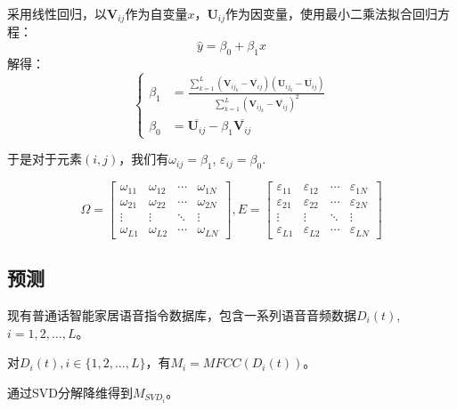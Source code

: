 \documentclass[lang=cn,cite=super]{elegantpaper}
\begin{document}
采用线性回归，以$\mathbf{V}_{ij}$作为自变量$x$，$\mathbf{U}_{ij}$作为因变量，使用最小二乘法拟合回归方程：
\begin{equation}
    \hat{y} = \beta_0 + \beta_1 x
\end{equation}
解得：
\begin{equation}
    \left\{ 
    \begin{aligned}
           \beta_1 &= \frac{\sum_{k=1}^{L} (\mathbf{V}_{{ij}_k}-\overline{\mathbf{V}_{ij}}) (\mathbf{U}_{{ij}_k}-\overline{\mathbf{U}_{ij}})}{\sum_{k=1}^{L} (\mathbf{V}_{{ij}_k}-\overline{\mathbf{V}_{ij}})^2}\\
        \beta_0 &= \overline{\mathbf{U}_{ij}}-\beta_1 \overline{\mathbf{V}_{ij}}
    \end{aligned}
    \right.
\end{equation}

于是对于元素$(i,j)$，我们有$\omega_{ij} = \beta_1$, $\varepsilon_{ij} = \beta_0$.

\begin{equation}
    \Omega = \begin{bmatrix}
        \omega_{11} & \omega_{12} & \cdots & \omega_{1N}\\
        \omega_{21} & \omega_{22} & \cdots & \omega_{2N}\\
        \vdots & \vdots & \ddots & \vdots \\
        \omega_{L1} & \omega_{L2} & \cdots & \omega_{LN}
    \end{bmatrix}, 
    E = \begin{bmatrix}
        \varepsilon_{11} & \varepsilon_{12} & \cdots & \varepsilon_{1N}\\
        \varepsilon_{21} & \varepsilon_{22} & \cdots & \varepsilon_{2N}\\
        \vdots & \vdots & \ddots & \vdots \\
        \varepsilon_{L1} & \varepsilon_{L2} & \cdots & \varepsilon_{LN}
    \end{bmatrix}
\end{equation}


\subsection{预测}
现有普通话智能家居语音指令数据库，包含一系列语音音频数据$D_i(t)$, $i = 1, 2, \ldots, L$。

对$D_i(t), i\in \{1,2,\ldots, L\}$，有$M_i = MFCC(D_i(t))$。

通过SVD分解降维得到$M_{SVD_i}$。
\end{document}
